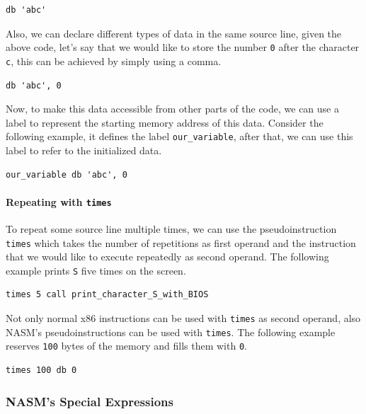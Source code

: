 \begin{lstlisting}
db 'abc'
\end{lstlisting}

Also, we can declare different types of data in the same source line,
given the above code, let's say that we would like to store the number
\lstinline!0! after the character \lstinline!c!, this can be achieved by
simply using a comma.

\begin{lstlisting}
db 'abc', 0
\end{lstlisting}

Now, to make this data accessible from other parts of the code, we can
use a label to represent the starting memory address of this data.
Consider the following example, it defines the label
\lstinline!our_variable!, after that, we can use this label to refer to
the initialized data.

\begin{lstlisting}
our_variable db 'abc', 0
\end{lstlisting}

\paragraph{\texorpdfstring{Repeating with
\texttt{times}}{Repeating with times}}\label{repeating-with-times}

To repeat some source line multiple times, we can use the
pseudoinstruction \lstinline!times! which takes the number of
repetitions as first operand and the instruction that we would like to
execute repeatedly as second operand. The following example prints
\lstinline!S! five times on the screen.

\begin{lstlisting}
times 5 call print_character_S_with_BIOS
\end{lstlisting}

Not only normal x86 instructions can be used with \lstinline!times! as
second operand, also NASM's pseudoinstructions can be used with
\lstinline!times!. The following example reserves \lstinline!100! bytes
of the memory and fills them with \lstinline!0!.

\begin{lstlisting}
times 100 db 0
\end{lstlisting}

\subsubsection{NASM's Special
Expressions}\label{nasms-special-expressions}


